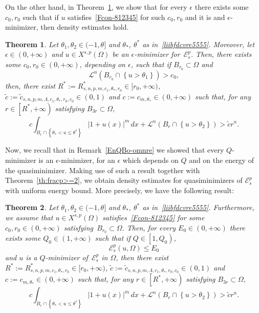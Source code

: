 \documentclass[12pt]{article}
\numberwithin{equation}{section}
\newtheorem{thm}{Theorem}[section]
\renewcommand{\leq}{\leqslant}
\begin{document}
On the other hand, in Theorem~\ref{ibcverty6}, we show that for every $\epsilon$ there exists some $c_0,r_0$ such that if $u$ satisfies~\eqref{Fcon-812345} for such $c_0,r_0$ and it is and $\epsilon$-minimizer, then density estimates hold. 


\begin{thm}\label{ibcverty6}
Let $\theta_1,\theta_2\in (-1,\theta]$ and $\theta_*$, $\theta^*$ as in~\eqref{liibfdcvre5555}. Moreover, let $\epsilon\in (0,+\infty)$ and $u\in X^{s,p}(\Omega)$ be an $\epsilon$-minimizer for~$\mathcal{E}_{s}^p$. Then, there exists some $c_0,r_0\in (0,+\infty)$, depending on $\epsilon$, such that if $B_{r_0}\subset \Omega$
and
\begin{equation*}
\mathcal{L}^{n}(B_{r_0}\cap \left\lbrace u>\theta_1 \right\rbrace)>c_0,
\end{equation*}
then, there exist $R^*:=R_{s,n,p,m,c_1,\theta_*,r_0}^*\in [r_0,+\infty)$, $\tilde{c}:=\tilde{c}_{s,n,p,m,\Lambda,c_1,\theta_*,r_0,c_0}\in (0,1)$ and $c:=c_{m,\theta_*}\in (0,+\infty)$ such that, for any $r\in \left[R^*,+\infty\right)$ satisfying $B_{3r}\subset \Omega$,
\begin{equation*}
c\int_{B_r\cap \left\lbrace \theta_{*}<u\leq \theta^* \right\rbrace}\left|1+u(x)\right|^m\,dx+\mathcal{L}^n(B_r\cap \left\lbrace u>\theta_2 \right\rbrace)>\tilde{c}r^n.
\end{equation*}
\end{thm}


Now, we recall that in Remark~\ref{EnQBo-omnre} we showed that every $Q$-minimizer is an $\epsilon$-minimizer, for an $\epsilon$ which depends on $Q$ and on the energy of the quasiminimizer. Making use of such a result together with Theorem~\ref{th:fracp>=2}, we obtain density estimates for quasiminimizers of $\mathcal{E}_s^p$ with uniform energy bound. More precisely, we have the following result: 

\begin{thm}
Let $\theta_1,\theta_2\in (-1,\theta]$  and $\theta_*$, $\theta^*$ as in~\eqref{liibfdcvre5555}. Furthermore, we assume that $u\in X^{s,p}(\Omega)$ satisfies~\eqref{Fcon-812345} for some $c_0,r_0\in (0,+\infty)$ satisfying~$B_{r_0}\subset\Omega$. 
Then, for every $E_0\in (0,+\infty)$ there exists some $Q_0\in (1,+\infty)$ such that if $Q\in \left[1,Q_0
\right)$,  
\begin{equation*}
\mathcal{E}_s^p(u,\Omega)\leq E_0
\end{equation*}
and $u$ is a $Q$-minimizer of~$\mathcal{E}_s^p$ in $\Omega$, then there exist $R^*:=R_{s,n,p,m,c_1,\theta_*,r_0}^*\in [r_0,+\infty)$, $\tilde{c}:=\tilde{c}_{s,n,p,m,\Lambda,c_1,\theta_*,r_0,c_0}\in (0,1)$ and $c:=c_{m,\theta_*}\in (0,+\infty)$ such that, for any $r\in \left[R^*,+\infty\right)$ satisfying $B_{3r}\subset \Omega$,
\begin{equation*}
c\int_{B_r\cap \left\lbrace \theta_{*}<u\leq \theta^* \right\rbrace}\left|1+u(x)\right|^m\,dx+\mathcal{L}^n(B_r\cap \left\lbrace u>\theta_2 \right\rbrace)>\tilde{c}r^n.
\end{equation*}
\end{thm}
\end{document}
